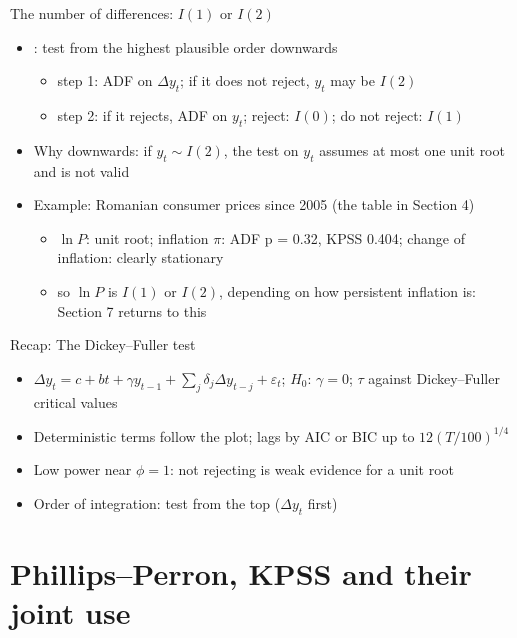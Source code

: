 \begin{frame}{The number of differences: $I(1)$ or $I(2)$}
\itemsize{\small}
\begin{itemize}
    \item {}: test from the highest plausible order downwards
    \begin{itemize}
        \item step 1: ADF on $\Delta y_t$; if it does not reject, $y_t$ may be $I(2)$
        \item step 2: if it rejects, ADF on $y_t$; reject: $I(0)$; do not reject: $I(1)$
    \end{itemize}
    \item Why downwards: if $y_t \sim I(2)$, the test on $y_t$ assumes at most one unit root and is not valid
    \item Example: Romanian consumer prices since 2005 (the table in Section 4)
    \begin{itemize}
        \item $\ln P$: unit root; inflation $\pi$: ADF p = 0.32, KPSS 0.404; change of inflation: clearly stationary
        \item so $\ln P$ is $I(1)$ or $I(2)$, depending on how persistent inflation is: Section 7 returns to this
    \end{itemize}
\end{itemize}
\end{frame}

\begin{frame}{Recap: The Dickey--Fuller test}
\itemsize{\small}
\begin{itemize}
    \item $\Delta y_t = c + bt + \gamma y_{t-1} + \sum_j\delta_j\Delta y_{t-j} + \varepsilon_t$; $H_0$: $\gamma = 0$; $\tau$ against Dickey--Fuller critical values
    \item Deterministic terms follow the plot; lags by AIC or BIC up to $12(T/100)^{1/4}$
    \item Low power near $\phi = 1$: not rejecting is weak evidence for a unit root
    \item Order of integration: test from the top ($\Delta y_t$ first)
\end{itemize}
\end{frame}


\section{Phillips--Perron, KPSS and their joint use}

